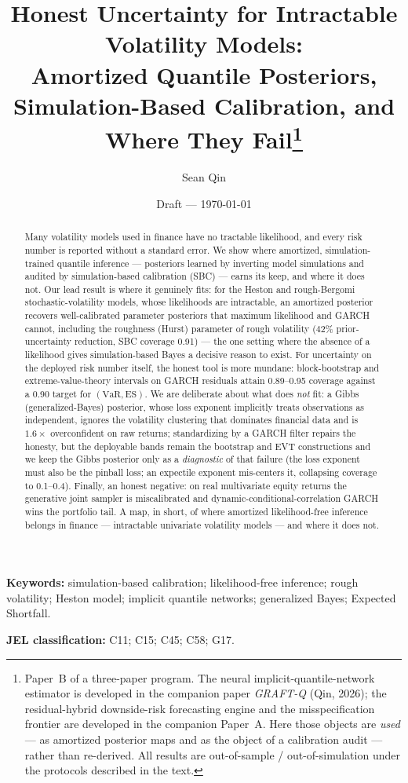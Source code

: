 \documentclass[11pt]{article}
\title{Honest Uncertainty for Intractable Volatility Models:\\
Amortized Quantile Posteriors, Simulation-Based Calibration,
and Where They Fail\thanks{Paper~B of a three-paper program. The neural
implicit-quantile-network estimator is developed in the companion paper
\emph{GRAFT-Q} (Qin, 2026); the residual-hybrid downside-risk forecasting
engine and the misspecification frontier are developed in the companion
Paper~A. Here those objects are \emph{used} --- as amortized posterior
maps and as the object of a calibration audit --- rather than
re-derived. All results are out-of-sample / out-of-simulation under the
protocols described in the text.}}
\author{Sean Qin}
\date{Draft --- \today}
\newcommand{\VaR}{\mathrm{VaR}}
\newcommand{\ES}{\mathrm{ES}}
\theoremstyle{remark}
\begin{document}
\maketitle

\begin{abstract}
Many volatility models used in finance have no tractable likelihood, and
every risk number is reported without a standard error. We show where
amortized, simulation-trained quantile inference --- posteriors learned
by inverting model simulations and audited by simulation-based
calibration (SBC) --- earns its keep, and where it does not. Our lead
result is where it genuinely fits: for the Heston and rough-Bergomi
stochastic-volatility models, whose likelihoods are intractable, an
amortized posterior recovers well-calibrated parameter posteriors that
maximum likelihood and GARCH cannot, including the roughness (Hurst)
parameter of rough volatility ($42\%$ prior-uncertainty reduction, SBC
coverage 0.91) --- the one setting where the absence of a likelihood
gives simulation-based Bayes a decisive reason to exist. For uncertainty
on the deployed risk number itself, the honest tool is more mundane:
block-bootstrap and extreme-value-theory intervals on GARCH residuals
attain 0.89--0.95 coverage against a 0.90 target for $(\VaR,\ES)$. We are
deliberate about what does \emph{not} fit: a Gibbs (generalized-Bayes)
posterior, whose loss exponent implicitly treats observations as
independent, ignores the volatility clustering that dominates financial
data and is $1.6\times$ overconfident on raw returns; standardizing by a
GARCH filter repairs the honesty, but the deployable bands remain the
bootstrap and EVT constructions and we keep the Gibbs posterior only as
a \emph{diagnostic} of that failure (the loss exponent must also be the
pinball loss; an expectile exponent mis-centers it, collapsing coverage
to 0.1--0.4). Finally, an honest negative: on real multivariate equity
returns the generative joint sampler is miscalibrated and
dynamic-conditional-correlation GARCH wins the portfolio tail. A map,
in short, of where amortized likelihood-free inference belongs in finance
--- intractable univariate volatility models --- and where it does not.
\end{abstract}

\noindent\textbf{Keywords:} simulation-based calibration; likelihood-free
inference; rough volatility; Heston model; implicit quantile networks;
generalized Bayes; Expected Shortfall.

\medskip
\noindent\textbf{JEL classification:} C11; C15; C45; C58; G17.
\end{document}
